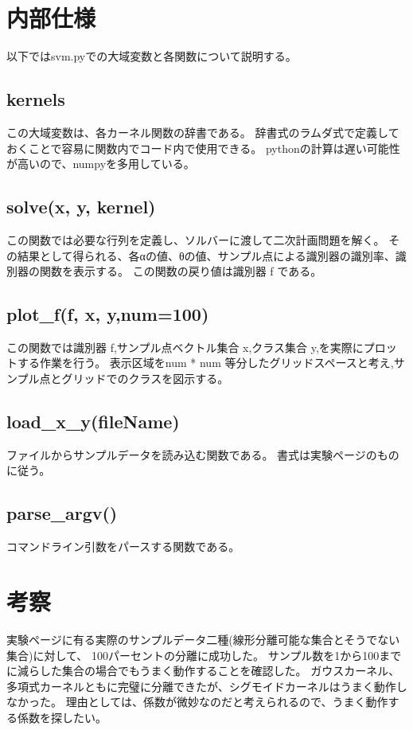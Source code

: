 \documentclass[]{jsarticle}
\begin{document}
\section{内部仕様}
以下ではsvm.pyでの大域変数と各関数について説明する。

\subsection{kernels}
この大域変数は、各カーネル関数の辞書である。
辞書式のラムダ式で定義しておくことで容易に関数内でコード内で使用できる。
pythonの計算は遅い可能性が高いので、numpyを多用している。

\subsection{solve(x, y, kernel)}
この関数では必要な行列を定義し、ソルバーに渡して二次計画問題を解く。
その結果として得られる、各αの値、θの値、サンプル点による識別器の識別率、識別器の関数を表示する。
この関数の戻り値は識別器 f である。

\subsection{plot\_f(f, x, y,num=100)}
この関数では識別器 f,サンプル点ベクトル集合 x,クラス集合 y,を実際にプロットする作業を行う。
表示区域をnum * num 等分したグリッドスペースと考え,サンプル点とグリッドでのクラスを図示する。

\subsection{load\_x\_y(fileName)}
ファイルからサンプルデータを読み込む関数である。
書式は実験ページのものに従う。

\subsection{parse\_argv()}
コマンドライン引数をパースする関数である。


\section{考察}
実験ページに有る実際のサンプルデータ二種(線形分離可能な集合とそうでない集合)に対して、
100パーセントの分離に成功した。
サンプル数を1から100までに減らした集合の場合でもうまく動作することを確認した。
ガウスカーネル、多項式カーネルともに完璧に分離できたが、シグモイドカーネルはうまく動作しなかった。
理由としては、係数が微妙なのだと考えられるので、うまく動作する係数を探したい。
\end{document}
